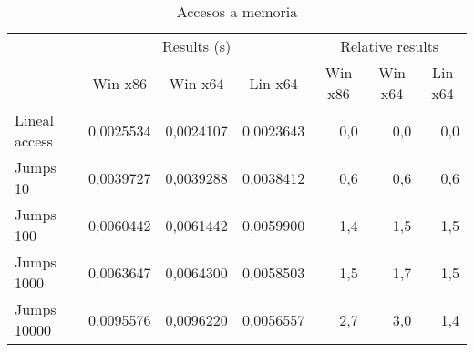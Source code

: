 \begin{table}[h]
\centering
\begin{tabular}{@{}l|rrr|rrr|@{}}
\cmidrule(l){2-7}
                                    & \multicolumn{3}{c|}{Results (s)}                                                               & \multicolumn{3}{c|}{Relative results}                                                      \\ \cmidrule(l){2-7} 
                                    & \multicolumn{1}{c|}{Win x86} & \multicolumn{1}{c|}{Win x64} & \multicolumn{1}{c|}{Lin x64} & \multicolumn{1}{c|}{Win x86} & \multicolumn{1}{c|}{Win x64} & \multicolumn{1}{c|}{Lin x64} \\ \midrule
\multicolumn{1}{|l|}{Lineal access} & 0,0025534                    & 0,0024107                    & 0,0023643                    & 0,0                          & 0,0                          & 0,0                          \\ \cmidrule(r){1-1}
\multicolumn{1}{|l|}{Jumps 10}      & 0,0039727                    & 0,0039288                    & 0,0038412                    & 0,6                          & 0,6                          & 0,6                          \\ \cmidrule(r){1-1}
\multicolumn{1}{|l|}{Jumps 100}     & 0,0060442                    & 0,0061442                    & 0,0059900                    & 1,4                          & 1,5                          & 1,5                          \\ \cmidrule(r){1-1}
\multicolumn{1}{|l|}{Jumps 1000}    & 0,0063647                    & 0,0064300                    & 0,0058503                    & 1,5                          & 1,7                          & 1,5                          \\ \cmidrule(r){1-1}
\multicolumn{1}{|l|}{Jumps 10000}   & 0,0095576                    & 0,0096220                    & 0,0056557                    & 2,7                          & 3,0                          & 1,4                          \\ \bottomrule
\end{tabular}
\caption{Accesos a memoria}
\end{table}


